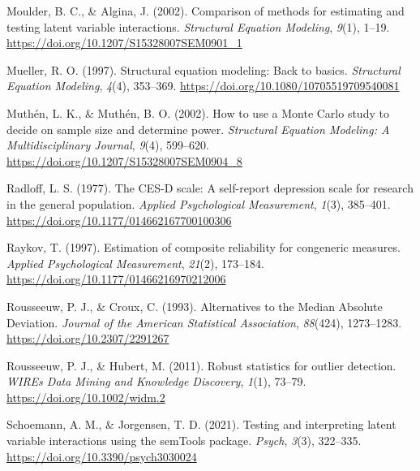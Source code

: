 \documentclass[
  man]{apa6}
\newlength{\cslhangindent}
\newlength{\cslentryspacingunit} %
\newenvironment{CSLReferences}[2] %
 {%
  \setlength{\parindent}{0pt}
  \ifodd #1
  \let\oldpar\par
  \def\par{\hangindent=\cslhangindent\oldpar}
  \fi
  \setlength{\parskip}{#2\cslentryspacingunit}
 }%
 {}
\begin{document}
\begin{CSLReferences}{1}{0}
\leavevmode{}%
Moulder, B. C., \& Algina, J. (2002). Comparison of methods for estimating and testing latent variable interactions. \emph{Structural Equation Modeling}, \emph{9}(1), 1--19. \url{https://doi.org/10.1207/S15328007SEM0901_1}

\leavevmode{}%
Mueller, R. O. (1997). Structural equation modeling: {Back} to basics. \emph{Structural Equation Modeling}, \emph{4}(4), 353--369. \url{https://doi.org/10.1080/10705519709540081}

\leavevmode{}%
Muthén, L. K., \& Muthén, B. O. (2002). How to use a {Monte Carlo} study to decide on sample size and determine power. \emph{Structural Equation Modeling: A Multidisciplinary Journal}, \emph{9}(4), 599--620. \url{https://doi.org/10.1207/S15328007SEM0904_8}

\leavevmode{}%
Radloff, L. S. (1977). The {CES-D} scale: {A} self-report depression scale for research in the general population. \emph{Applied Psychological Measurement}, \emph{1}(3), 385--401. \url{https://doi.org/10.1177/014662167700100306}

\leavevmode{}%
Raykov, T. (1997). Estimation of composite reliability for congeneric measures. \emph{Applied Psychological Measurement}, \emph{21}(2), 173--184. \url{https://doi.org/10.1177/01466216970212006}

\leavevmode{}%
Rousseeuw, P. J., \& Croux, C. (1993). Alternatives to the {Median Absolute Deviation}. \emph{Journal of the American Statistical Association}, \emph{88}(424), 1273--1283. \url{https://doi.org/10.2307/2291267}

\leavevmode{}%
Rousseeuw, P. J., \& Hubert, M. (2011). Robust statistics for outlier detection. \emph{WIREs Data Mining and Knowledge Discovery}, \emph{1}(1), 73--79. \url{https://doi.org/10.1002/widm.2}

\leavevmode{}%
Schoemann, A. M., \& Jorgensen, T. D. (2021). Testing and interpreting latent variable interactions using the {semTools} package. \emph{Psych}, \emph{3}(3), 322--335. \url{https://doi.org/10.3390/psych3030024}


\end{CSLReferences}
\end{document}

